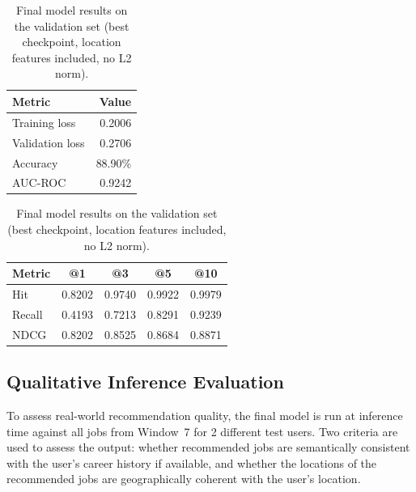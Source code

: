 \begin{table}[htbp]
    \centering
    \caption{Final model results on the validation set (best checkpoint,
    location features included, no L2 norm).}
    \label{tab:final_results_user}
    \begin{minipage}{0.35\linewidth}
        \centering
        \begin{tabular}{lr}
            \toprule
            \textbf{Metric} & \textbf{Value} \\
            \midrule
            Training loss   & 0.2006 \\
            Validation loss & 0.2706 \\
            Accuracy        & 88.90\% \\
            AUC-ROC         & 0.9242 \\
            \bottomrule
        \end{tabular}
    \end{minipage}
    \hfill
    \begin{minipage}{0.60\linewidth}
        \centering
        \begin{tabular}{lcccc}
            \toprule
            \textbf{Metric} & \textbf{@1} & \textbf{@3} & \textbf{@5} & \textbf{@10} \\
            \midrule
            Hit    & 0.8202 & 0.9740 & 0.9922 & 0.9979 \\
            Recall & 0.4193 & 0.7213 & 0.8291 & 0.9239 \\
            NDCG   & 0.8202 & 0.8525 & 0.8684 & 0.8871 \\
            \bottomrule
        \end{tabular}
    \end{minipage}
\end{table}

\subsection{Qualitative Inference Evaluation}
\label{sec:exp_user_inference}
 
To assess real-world recommendation quality, the final model is run 
at inference time against all jobs from Window~7 for 2 different test users. Two criteria are used to assess the 
output: whether recommended jobs are semantically consistent with the 
user's career history if available, and whether the locations of the recommended jobs are geographically coherent with the user's location. 

